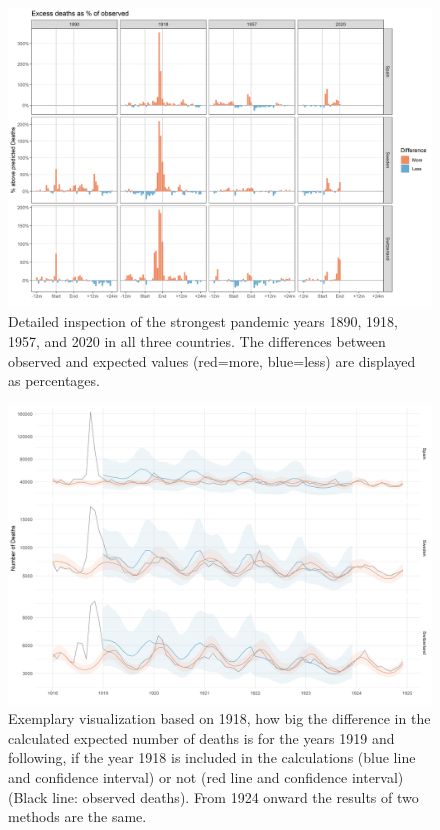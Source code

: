 \documentclass{article}
\begin{document}
	
	\begin{figure}[H]
		\centering	
		\includegraphics[width=\linewidth]{../Figure_S2_mean.png}
		\caption{Detailed inspection of the strongest pandemic years 1890, 1918, 1957, and 2020 in all three countries. The differences between observed and expected values (red=more, blue=less) are displayed as percentages.}
	\end{figure}

	
	\begin{figure}[H]
		\centering	
		\includegraphics[width=\linewidth]{../Figure_S3_mean.png}
		\caption{Exemplary visualization based on 1918, how big the difference in the calculated expected number of deaths is for the years 1919 and following, if the year 1918 is included in the calculations (blue line and confidence interval) or not (red line and confidence interval) (Black line: observed deaths). From 1924 onward the results of two methods are the same. }
	\end{figure}
\end{document}
